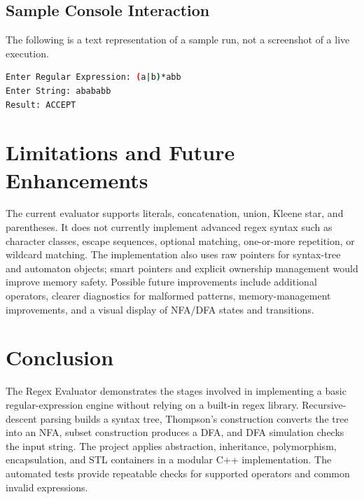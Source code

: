 \documentclass[12pt,a4paper]{report}
\begin{document}
\subsection{Sample Console Interaction}
The following is a text representation of a sample run, not a screenshot of a live execution.
\begin{lstlisting}[language=bash,numbers=none]
Enter Regular Expression: (a|b)*abb
Enter String: abababb
Result: ACCEPT
\end{lstlisting}

\section{Limitations and Future Enhancements}
The current evaluator supports literals, concatenation, union, Kleene star, and parentheses. It does not currently implement advanced regex syntax such as character classes, escape sequences, optional matching, one-or-more repetition, or wildcard matching. The implementation also uses raw pointers for syntax-tree and automaton objects; smart pointers and explicit ownership management would improve memory safety. Possible future improvements include additional operators, clearer diagnostics for malformed patterns, memory-management improvements, and a visual display of NFA/DFA states and transitions.

\section{Conclusion}
The Regex Evaluator demonstrates the stages involved in implementing a basic regular-expression engine without relying on a built-in regex library. Recursive-descent parsing builds a syntax tree, Thompson's construction converts the tree into an NFA, subset construction produces a DFA, and DFA simulation checks the input string. The project applies abstraction, inheritance, polymorphism, encapsulation, and STL containers in a modular C++ implementation. The automated tests provide repeatable checks for supported operators and common invalid expressions.
\end{document}

